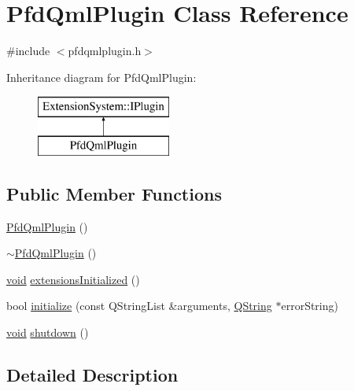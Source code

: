 \hypertarget{class_pfd_qml_plugin}{\section{\-Pfd\-Qml\-Plugin \-Class \-Reference}
\label{class_pfd_qml_plugin}
}


{\ttfamily \#include $<$pfdqmlplugin.\-h$>$}

\-Inheritance diagram for \-Pfd\-Qml\-Plugin\-:\begin{figure}[H]
\begin{center}
\leavevmode
\includegraphics[height=2.000000cm]{class_pfd_qml_plugin}
\end{center}
\end{figure}
\subsection*{\-Public \-Member \-Functions}
\begin{DoxyCompactItemize}
\item 
\hyperlink{class_pfd_qml_plugin_a9955332218a872bfa18350ec1b73c03c}{\-Pfd\-Qml\-Plugin} ()
\item 
\hyperlink{class_pfd_qml_plugin_a374958f01b874394eeb1beca385e7598}{$\sim$\-Pfd\-Qml\-Plugin} ()
\item 
\hyperlink{group___u_a_v_objects_plugin_ga444cf2ff3f0ecbe028adce838d373f5c}{void} \hyperlink{class_pfd_qml_plugin_a6c95a7f2f165134d33ef84acdf6a96f8}{extensions\-Initialized} ()
\item 
bool \hyperlink{class_pfd_qml_plugin_a5829e5ecd64024c4d9962550c0beffcb}{initialize} (const \-Q\-String\-List \&arguments, \hyperlink{group___u_a_v_objects_plugin_gab9d252f49c333c94a72f97ce3105a32d}{\-Q\-String} $\ast$error\-String)
\item 
\hyperlink{group___u_a_v_objects_plugin_ga444cf2ff3f0ecbe028adce838d373f5c}{void} \hyperlink{class_pfd_qml_plugin_a39d4ab7d539a9a77adc57b8ecf33e781}{shutdown} ()
\end{DoxyCompactItemize}


\subsection{\-Detailed \-Description}


